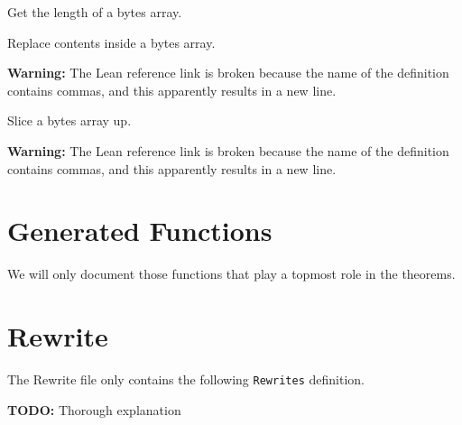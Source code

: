 \begin{definition}[lengthBytes]\label{def:lengthBytes}
\leanok{}
Get the length of a bytes array.
\end{definition}

\begin{definition}[replaceAtBytes]\label{def:replaceAtBytes}
\leanok{}
Replace contents inside a bytes array.

\textbf{Warning:} The Lean reference link is broken because the name of the
definition contains commas, and this apparently results in a new line.
\end{definition}

\begin{definition}[substrBytes]\label{def:substrBytes}
\leanok{}
Slice a bytes array up.

\textbf{Warning:} The Lean reference link is broken because the name of the
definition contains commas, and this apparently results in a new line.
\end{definition}

\section{Generated Functions}

We will only document those functions that play a topmost role in the theorems.

\section{Rewrite}
The Rewrite file only contains the following \texttt{Rewrites} definition.

\begin{definition}[Rewrites]\label{def:Rewrites}\leanok
\textbf{TODO:} Thorough explanation
\end{definition}

